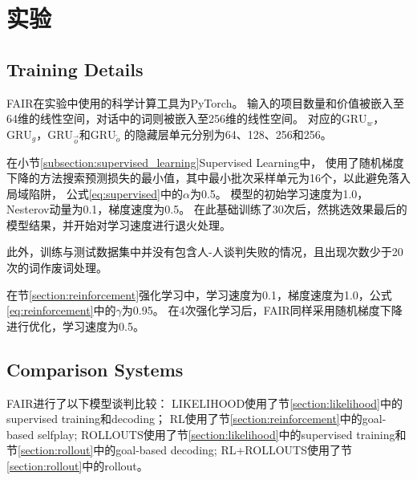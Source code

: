 \section{实验}
\label{section:experments}

\subsection{Training Details}
FAIR在实验中使用的科学计算工具为PyTorch。
输入的项目数量和价值被嵌入至64维的线性空间，对话中的词则被嵌入至256维的线性空间。
对应的$\text{GRU}_w$，$\text{GRU}_g$，$\text{GRU}_{\overrightarrow{o}}$和$\text{GRU}_{\overleftarrow{o}}$
的隐藏层单元分别为64、128、256和256。

在小节\ref{subsection:supervised_learning}Supervised Learning中，
使用了随机梯度下降的方法搜索预测损失的最小值，其中最小批次采样单元为16个，以此避免落入局域陷阱，
公式\ref{eq:supervised}中的$\alpha$为0.5。
模型的初始学习速度为1.0，Nesterov动量为0.1，梯度速度为0.5。
在此基础训练了30次后，然挑选效果最后的模型结果，并开始对学习速度进行退火处理。

此外，训练与测试数据集中并没有包含人-人谈判失败的情况，且出现次数少于20次的词作废词处理。

在节\ref{section:reinforcement}强化学习中，学习速度为0.1，梯度速度为1.0，公式\ref{eq:reinforcement}中的$\gamma$为0.95。
在4次强化学习后，FAIR同样采用随机梯度下降进行优化，学习速度为0.5。

\subsection{Comparison Systems}
FAIR进行了以下模型谈判比较：
LIKELIHOOD使用了节\ref{section:likelihood}中的supervised training和decoding；
RL使用了节\ref{section:reinforcement}中的goal-based selfplay;
ROLLOUTS使用了节\ref{section:likelihood}中的supervised training和节\ref{section:rollout}中的goal-based decoding;
RL+ROLLOUTS使用了节\ref{section:rollout}中的rollout。


